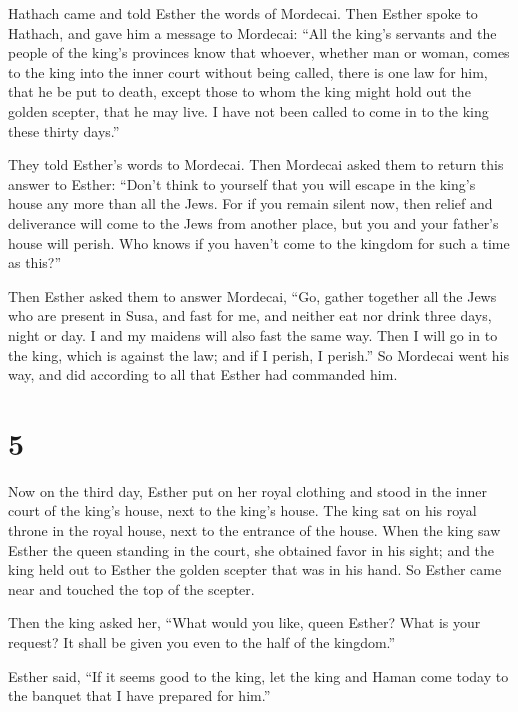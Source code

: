  Hathach came and told Esther the words of Mordecai.
 Then Esther spoke to Hathach, and gave him a message to
Mordecai:  ``All the king's servants and the people of
the king's provinces know that whoever, whether man or woman, comes to
the king into the inner court without being called, there is one law for
him, that he be put to death, except those to whom the king might hold
out the golden scepter, that he may live. I have not been called to come
in to the king these thirty days.''

 They told Esther's words to Mordecai. 
Then Mordecai asked them to return this answer to Esther: ``Don't think
to yourself that you will escape in the king's house any more than all
the Jews.  For if you remain silent now, then relief and
deliverance will come to the Jews from another place, but you and your
father's house will perish. Who knows if you haven't come to the kingdom
for such a time as this?''

 Then Esther asked them to answer Mordecai,
 ``Go, gather together all the Jews who are present in
Susa, and fast for me, and neither eat nor drink three days, night or
day. I and my maidens will also fast the same way. Then I will go in to
the king, which is against the law; and if I perish, I perish.''
 So Mordecai went his way, and did according to all that
Esther had commanded him.

\hypertarget{section-4}{%
\section{5}\label{section-4}}

 Now on the third day, Esther put on her royal clothing
and stood in the inner court of the king's house, next to the king's
house. The king sat on his royal throne in the royal house, next to the
entrance of the house.  When the king saw Esther the queen
standing in the court, she obtained favor in his sight; and the king
held out to Esther the golden scepter that was in his hand. So Esther
came near and touched the top of the scepter.

 Then the king asked her, ``What would you like, queen
Esther? What is your request? It shall be given you even to the half of
the kingdom.''

 Esther said, ``If it seems good to the king, let the king
and Haman come today to the banquet that I have prepared for him.''

